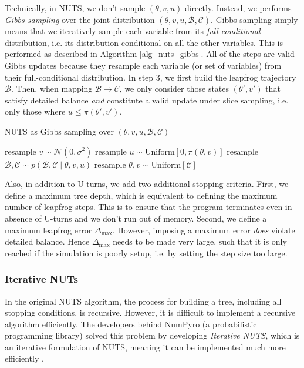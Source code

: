 \documentclass[12pt]{article}
\begin{document}
{Technically, in NUTS, we don't sample $(\theta,v,u)$ directly. Instead, we performs \textit{Gibbs sampling} over the joint distribution $(\theta, v, u, \mathcal{B}, \mathcal{C})$. Gibbs sampling simply means that we iteratively sample each variable from its \textit{full-conditional} distribution, i.e. its distribution conditional on all the other variables. This is performed as described in Algorithm \ref{alg_nuts_gibbs}. All of the steps are valid Gibbs updates because they resample each variable (or set of variables) from their full-conditional distribution. In step 3, we first build the leapfrog trajectory $\mathcal{B}$. Then, when mapping $\mathcal{B} \rightarrow \mathcal{C}$, we only consider those states $(\theta', v')$ that satisfy detailed balance \textit{and} constitute a valid update under slice sampling, i.e. only those where $u \leq \pi(\theta', v')$.

\begin{algorithm}
\caption{NUTS as Gibbs sampling over $(\theta, v, u, \mathcal{B}, \mathcal{C})$}
\label{alg_nuts_gibbs}
\begin{algorithmic}
\State resample $v \sim \mathcal{N}(0, \sigma^2)$
\State resample $u \sim \text{Uniform} [0, \pi(\theta, v)]$
\State resample $\mathcal{B}, \mathcal{C} \sim p(\mathcal{B}, \mathcal{C} \mid \theta, v, u)$
\State resample $\theta, v \sim \text{Uniform}[\mathcal{C}]$
\EndFor
\end{algorithmic}
\end{algorithm}

Also, in addition to U-turns, we add two additional stopping criteria. First, we define a maximum tree depth, which is equivalent to defining the maximum number of leapfrog steps. This is to ensure that the program terminates even in absence of U-turns and we don't run out of memory. Second, we define a maximum leapfrog error $\Delta_\text{max}$. However, imposing a maximum error \textit{does} violate detailed balance. Hence $\Delta_\text{max}$ needs to be made very large, such that it is only reached if the simulation is poorly setup, i.e. by setting the step size too large.

\subsubsection{Iterative NUTs}

In the original NUTS algorithm, the process for building a tree, including all stopping conditions, is recursive. However, it is difficult to implement a recursive algorithm efficiently. The developers behind NumPyro (a probabilistic programming library) solved this problem by developing \textit{Iterative NUTS}, which is an iterative formulation of NUTS, meaning it can be implemented much more efficiently \cite{numpyro}.

}
\end{document}
